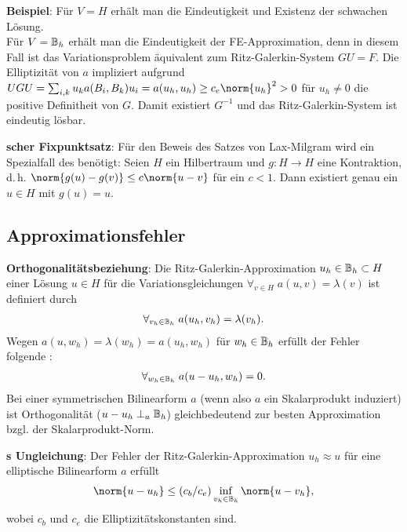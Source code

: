 \linie
\pagebreak

\textbf{Beispiel}:
Für $V = H$ erhält man die Eindeutigkeit und Existenz der schwachen Lösung.\\
Für $V = \mathbb{B}_h$ erhält man die Eindeutigkeit der FE-Approximation, denn in diesem Fall ist
das Variationsproblem äquivalent zum Ritz-Galerkin-System $GU = F$.
Die Elliptizität von $a$ impliziert aufgrund
$UGU = \sum_{i,k} u_k a(B_i, B_k) u_i = a(u_h, u_h) \ge c_e \norm{u_h}^2 > 0$
für $u_h \not= 0$ die positive Definitheit von $G$.
Damit existiert $G^{-1}$ und das Ritz-Galerkin-System ist eindeutig lösbar.

\textbf{scher Fixpunktsatz}:
Für den Beweis des Satzes von Lax-Milgram wird ein Spezialfall des
 benötigt:
Seien $H$ ein Hilbertraum und $g\colon H \rightarrow H$ eine Kontraktion, d.\,h.
$\norm{g(u) - g(v)} \le c \norm{u - v}$ für ein $c < 1$.
Dann existiert genau ein $u \in H$ mit $g(u) = u$.

\subsection{%
    Approximationsfehler%
}

\textbf{Orthogonalitätsbeziehung}:
Die Ritz-Galerkin-Approximation $u_h \in \mathbb{B}_h \subset H$ einer Lösung $u \in H$ für die
Variationsgleichungen $\forall_{v \in H}\; a(u, v) = \lambda(v)$
ist definiert durch
\begin{align*}
    \forall_{v_h \in \mathbb{B}_h}\; a(u_h, v_h) = \lambda(v_h).
\end{align*}
Wegen $a(u, w_h) = \lambda(w_h) = a(u_h, w_h)$ für $w_h \in \mathbb{B}_h$ erfüllt
der Fehler folgende :
\begin{align*}
    \forall_{w_h \in \mathbb{B}_h}\; a(u - u_h, w_h) = 0.
\end{align*}
Bei einer symmetrischen Bilinearform $a$ (wenn also $a$ ein Skalarprodukt induziert)
ist Orthogonalität ($u - u_h \perp_a \mathbb{B}_h$)
gleichbedeutend zur besten Approximation bzgl. der Skalarprodukt-Norm.

\linie

\textbf{s Ungleichung}:
Der Fehler der Ritz-Galerkin-Approximation $u_h \approx u$ für eine elliptische Bilinearform $a$
erfüllt
\begin{align*}
    \norm{u - u_h} \le (c_b/c_e) \inf_{v_h \in \BB_h} \norm{u - v_h},
\end{align*}
wobei $c_b$ und $c_e$ die Elliptizitätskonstanten sind.

